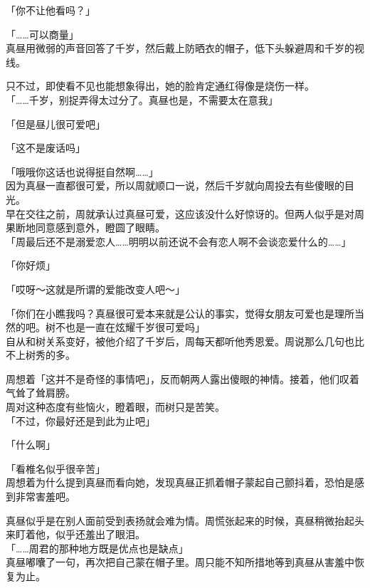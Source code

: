 「你不让他看吗？」

「……可以商量」\\

真昼用微弱的声音回答了千岁，然后戴上防晒衣的帽子，低下头躲避周和千岁的视线。

只不过，即使看不见也能想象得出，她的脸肯定通红得像是烧伤一样。\\

「……千岁，别捉弄得太过分了。真昼也是，不需要太在意我」

「但是昼儿很可爱吧」

「这不是废话吗」

「哦哦你这话也说得挺自然啊……」\\

因为真昼一直都很可爱，所以周就顺口一说，然后千岁就向周投去有些傻眼的目光。\\

早在交往之前，周就承认过真昼可爱，这应该没什么好惊讶的。但两人似乎是对周果断地同意感到意外，瞪圆了眼睛。\\

「周最后还不是溺爱恋人……明明以前还说不会有恋人啊不会谈恋爱什么的……」

「你好烦」

「哎呀～这就是所谓的爱能改变人吧～」

「你们在小瞧我吗？真昼很可爱本来就是公认的事实，觉得女朋友可爱也是理所当然的吧。树不也是一直在炫耀千岁很可爱吗」\\

自从和树关系变好，被他介绍了千岁后，周每天都听他秀恩爱。周说那么几句也比不上树秀的多。

周想着「这并不是奇怪的事情吧」，反而朝两人露出傻眼的神情。接着，他们叹着气耸了耸肩膀。\\

周对这种态度有些恼火，瞪着眼，而树只是苦笑。\\

「不过，你最好还是到此为止吧」

「什么啊」

「看椎名似乎很辛苦」\\

周想着为什么提到真昼而看向她，发现真昼正抓着帽子蒙起自己颤抖着，恐怕是感到非常害羞吧。

真昼似乎是在别人面前受到表扬就会难为情。周慌张起来的时候，真昼稍微抬起头来盯着他，似乎还羞出了眼泪。\\

「……周君的那种地方既是优点也是缺点」\\

真昼嘟囔了一句，再次把自己蒙在帽子里。周只能不知所措地等到真昼从害羞中恢复为止。
